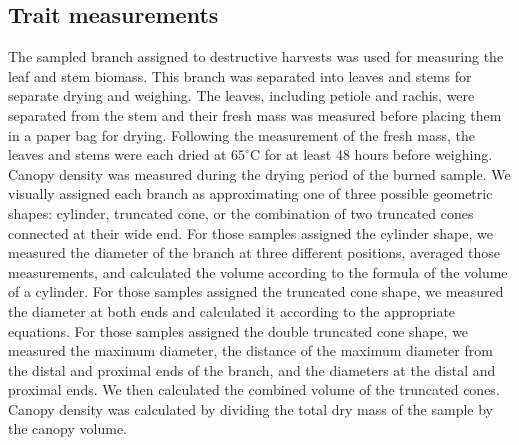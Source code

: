 \documentclass{bmcart}
\begin{document}
\subsection*{Trait measurements}
The sampled branch assigned to destructive harvests was used for measuring the leaf and stem biomass. This branch was separated into leaves and stems for separate drying and weighing. The leaves, including petiole and rachis, were separated from the stem and their fresh mass was measured before placing them in a paper bag for drying. Following the measurement of the fresh mass, the leaves and stems were each dried at $65^{\circ}$C for at least 48 hours before weighing. Canopy density was measured during the drying period of the burned sample. We visually assigned each branch as approximating one of three possible geometric shapes: cylinder, truncated cone, or the combination of two truncated cones connected at their wide end. For those samples assigned the cylinder shape, we measured the diameter of the branch at three different positions, averaged those measurements, and calculated the volume according to the formula of the volume of a cylinder. For those samples assigned the truncated cone shape, we measured the diameter at both ends and calculated it according to the appropriate equations. For those samples assigned the double truncated cone shape, we measured the maximum diameter, the distance of the maximum diameter from the distal and proximal ends of the branch, and the diameters at the distal and proximal ends. We then calculated the combined volume of the truncated cones. Canopy density was calculated by dividing the total dry mass of the sample by the canopy volume.
\end{document}
